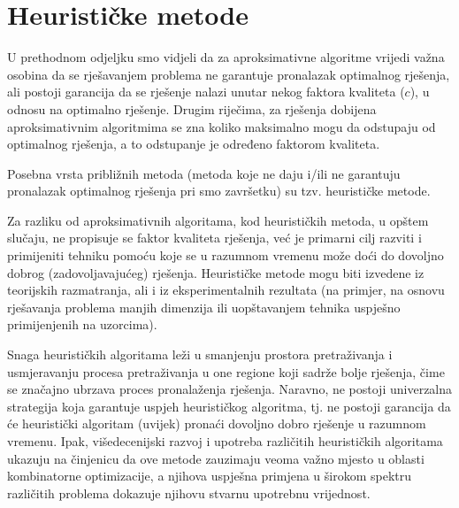 \documentclass[a4paper, utf8, 11pt, colorlinks]{book}
\begin{document}

  
\section{Heurističke metode}
 U prethodnom odjeljku smo vidjeli da za aproksimativne algoritme vrijedi važna osobina da se rješavanjem problema ne garantuje pronalazak optimalnog rješenja, ali postoji garancija da se rješenje nalazi unutar nekog faktora kvaliteta ($c$), u odnosu na optimalno rješenje. 
 Drugim riječima, za rješenja dobijena aproksimativnim algoritmima se zna koliko maksimalno mogu da odstupaju od optimalnog rješenja, a to odstupanje je određeno faktorom kvaliteta.
 
 Posebna vrsta približnih metoda (metoda koje ne daju i/ili ne garantuju pronalazak optimalnog rješenja pri smo završetku) su tzv. heurističke metode. 
 
 Za razliku od aproksimativnih algoritama, kod heurističkih metoda, u opštem slučaju, ne propisuje se faktor kvaliteta rješenja, već je primarni cilj razviti i primijeniti tehniku pomoću koje se u razumnom vremenu može doći do dovoljno dobrog (zadovoljavajućeg) rješenja. Heurističke metode mogu biti izvedene iz teorijskih razmatranja, ali i iz eksperimentalnih rezultata (na primjer, na osnovu rješavanja problema manjih dimenzija ili uopštavanjem tehnika uspješno primijenjenih na uzorcima). 
 
 
 Snaga heurističkih algoritama leži u smanjenju prostora pretraživanja i usmjeravanju procesa pretraživanja u one regione koji sadrže bolje rješenja, čime se značajno ubrzava proces pronalaženja rješenja. Naravno, ne postoji univerzalna strategija koja garantuje uspjeh heurističkog algoritma, tj. ne postoji garancija da će heuristički algoritam (uvijek) pronaći dovoljno dobro rješenje u razumnom vremenu. Ipak, višedecenijski razvoj i upotreba različitih heurističkih algoritama ukazuju na činjenicu da ove metode zauzimaju veoma važno mjesto u oblasti kombinatorne optimizacije, a njihova uspješna primjena u širokom spektru različitih problema dokazuje njihovu stvarnu upotrebnu vrijednost.
 
\end{document}
